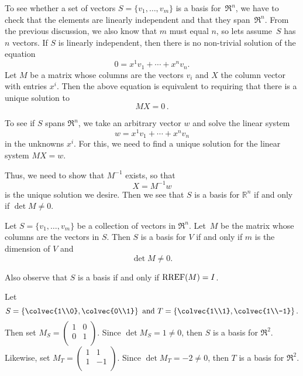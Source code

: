 To see whether a set of vectors $S=\{v_1, \ldots, v_m \}$ is a basis for~$\Re^n$, we have to check that the elements  are linearly independent and that they span~$\Re^n$.  From the previous discussion, we also know that $m$ must equal $n$, so lets assume~$S$ has $n$ vectors.
If $S$ is linearly independent, then there is no non-trivial solution of the equation
\[
0 = x^1v_1+\cdots + x^nv_n.
\]
Let $M$ be a matrix whose columns are the vectors $v_i$ and $X$ the column vector with entries $x^i$.  Then the above equation is equivalent to requiring that there is a unique solution to \[MX=0\, .\]

To see if $S$ spans $\Re^n$, we take an arbitrary vector $w$ and solve the linear system
\[
w=x^1v_1+\cdots + x^nv_n
\]
in the unknowns $x^i$.  For this, we need to find a unique solution for the linear system $MX=w$.  

Thus, we need to show that $M^{-1}$ exists, so that 
\[
X=M^{-1}w
\]
is the unique solution we desire.  Then we see that $S$ is a basis for $\mathbb{R}^n$ if and only if $\det M\neq 0$.




\begin{theorem}
Let $S=\{v_1, \ldots, v_m \}$ be a collection of vectors in $\Re^n$.  Let~$M$ be the matrix whose columns are the vectors in $S$.  Then $S$ is a basis for $V$ if and only if $m$ is the dimension of $V$ and 
\[
\det M \neq 0.
\]
\end{theorem}

\begin{remark}
Also observe that  $S$ is a basis if and only if ${\rm RREF}(M)=I$.
\end{remark}

\begin{example}
Let 
\[
S=\left\{ \colvec{1\\0}, \colvec{0\\1} \right\} \text{ and }
T=\left\{ \colvec{1\\1}, \colvec{1\\-1} \right\}.
\]
Then set $M_S=\begin{pmatrix}
1 & 0\\
0 & 1\\
\end{pmatrix}$.  Since $\det M_S=1\neq 0$, then $S$ is a basis for $\Re^2$.\\

\noindent
Likewise, set $M_T=\begin{pmatrix}
1 & 1\\
1 & -1\\
\end{pmatrix}$.  Since $\det M_T=-2\neq 0$, then $T$ is a basis for $\Re^2$.
\end{example}


